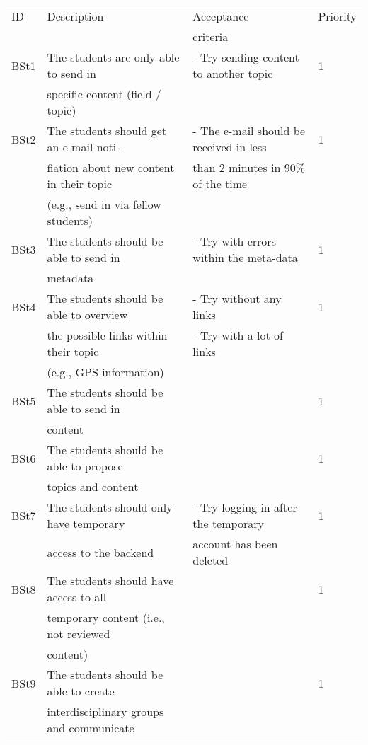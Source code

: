 \begin{table}[h]
\centering%
\begin{tabular}{llll}
	\toprule
ID 	& Description 	& Acceptance 	& Priority \\
 	& 			 & criteria 	&  \\
\cmidrule(rl){1-1}\cmidrule(rl){2-2}\cmidrule(rl){3-3}\cmidrule(rl){4-4}
BSt1 & The students are only able to send in 		& - Try sending content to another topic & 1	\\
 	& specific content (field / topic) 			&  & 		\\
\hline
BSt2	& The students should get an e-mail noti- 	& - The e-mail should be received in less & 1	\\
 	& fiation about new content in their topic 	& than 2 minutes in 90\% of the time & 	\\
 	& (e.g., send in via fellow students) 		&  & 	\\
\hline
BSt3 & The students should be able to send in  	& - Try with errors within the meta-data & 1\\
 	& metadata 							&  & \\
\hline
BSt4 & The students should be able to overview 	& - Try without any links & 1\\
 	& the possible links within their topic 		& - Try with a lot of links & \\
 	& (e.g., GPS-information) 				&  & \\
\hline
BSt5 & The students should be able to send in  	&  & 1\\
 	& content								&  & \\
\hline
BSt6 & The students should be able to propose  	&  & 1\\
 	& topics and content  				    	&  & \\
\hline
BSt7 & The students should only have temporary 	& - Try logging in after the temporary & 1\\
	& access to the backend					& account has been deleted	& \\	
\hline
BSt8 & The students should have access to all 	&  	& 1\\
	& temporary content (i.e., not reviewed 		&	& \\
	&	content)							&	& \\
\hline
BSt9 & The students should be able to create 	&  	& 1\\
	& interdisciplinary groups and communicate	&	& \\

\end{tabular}
\end{table}
